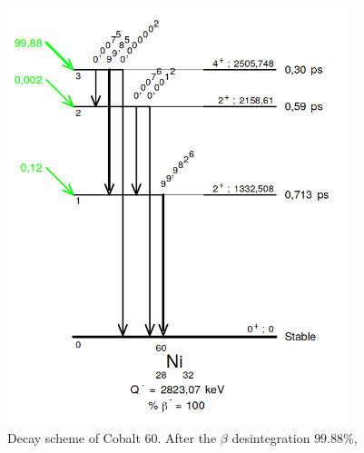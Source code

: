 \begin{figure}
  \centering
  \includegraphics[width=10cm]{CoSource/fig_CoSource/Co_decay_scheme.png}

  \caption{Decay scheme of Cobalt $60$.
    After the $\beta$ desintegration $99.88$\%,
  \label{fig:Co_decay_scheme}}
\end{figure}
